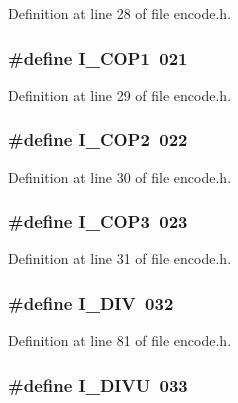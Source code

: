 Definition at line 28 of file encode.\+h.

\subsubsection[{I\+\_\+\+C\+O\+P1}]{\setlength{\rightskip}{0pt plus 5cm}\#define I\+\_\+\+C\+O\+P1~021}\label{encode_8h_aa7c809658dea9d2d47ab45af2fe294e0}


Definition at line 29 of file encode.\+h.

\subsubsection[{I\+\_\+\+C\+O\+P2}]{\setlength{\rightskip}{0pt plus 5cm}\#define I\+\_\+\+C\+O\+P2~022}\label{encode_8h_a3196a8b1f7eb7731b29db9dfdf45b2f1}


Definition at line 30 of file encode.\+h.

\subsubsection[{I\+\_\+\+C\+O\+P3}]{\setlength{\rightskip}{0pt plus 5cm}\#define I\+\_\+\+C\+O\+P3~023}\label{encode_8h_ada94bd687fa10848ecd1333cbe4b8da1}


Definition at line 31 of file encode.\+h.

\subsubsection[{I\+\_\+\+D\+IV}]{\setlength{\rightskip}{0pt plus 5cm}\#define I\+\_\+\+D\+IV~032}\label{encode_8h_a999482e7b3c581ab0dd10c343742dd1b}


Definition at line 81 of file encode.\+h.

\subsubsection[{I\+\_\+\+D\+I\+VU}]{\setlength{\rightskip}{0pt plus 5cm}\#define I\+\_\+\+D\+I\+VU~033}\label{encode_8h_a568cc688c5d76a9fa8044c21070a5b36}


